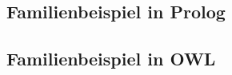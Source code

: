 \subsection{Familienbeispiel in Prolog}
\label{ssec:anh_beispiel_g_prolog}


\subsection{Familienbeispiel in OWL}
\label{ssec:anh_beispiel_g_owl}




